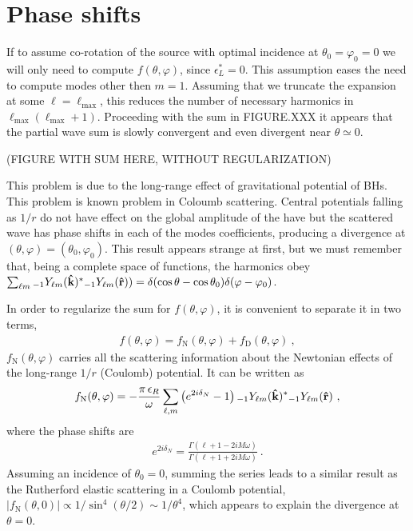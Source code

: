 
\section{Phase shifts}

If to assume co-rotation of the source with optimal incidence at $\theta_0=\varphi_0=0$ we will only need to compute $f(\theta,\varphi)$, since $\epsilon_L^*=0$.
This assumption eases the need to compute modes other then $m=1$.
Assuming that we truncate the expansion  at some $\ell=\ell_{\max}$, this reduces the number of necessary harmonics in $\ell_{\max}(\ell_{\max} + 1)$.
Proceeding with the sum in FIGURE.XXX it appears that the partial wave sum is slowly convergent and even divergent near $\theta \simeq 0$.

(FIGURE WITH SUM HERE, WITHOUT REGULARIZATION)

This problem is due to the long-range effect of gravitational potential of BHs. This problem is known problem in Coloumb scattering. Central potentials falling as $1/r$ do not have effect on the global amplitude of the have but the scattered wave has phase shifts in each of the modes coefficients, producing a divergence at $(\theta,\varphi)=(\theta_0,\varphi_0)$.
This result appears strange at first, but we must remember that, being a complete space of functions, the harmonics obey $\sum_{\ell m} \uu[-1]{Y}{\ell m}(\mathbf{\hat{k}})^{*} \uu[-1]{Y}{\ell m}(\mathbf{\hat{r}})) = \delta(\cos\theta - \cos\theta_0) \delta(\varphi - \varphi_0)$.

In order to regularize the sum for $f(\theta,\varphi)$, it is convenient to separate it in two terms,
\begin{align}
    \label{eq5:fNfD}
    f(\theta,\varphi) = f_\mathrm{N}(\theta,\varphi) + f_\mathrm{D}(\theta,\varphi) ~,
\end{align}
$f_\mathrm{N}(\theta,\varphi)$ carries all the scattering information about the Newtonian effects of the long-range $1/r$ (Coulomb) potential.
It can be written as
\begin{align}
    f_\mathrm{N}(\theta,\varphi) = - \frac{\pi \,\epsilon_R}{\omega}
    \sum_{\ell,m} \left( e^{2 i \delta_N } - 1 \right)
    \uu[-1]{Y}{\ell m}(\mathbf{\hat{k}})^{*} \uu[-1]{Y}{\ell m}(\mathbf{\hat{r}}) ~,
\end{align}
where the phase shifts are \cite{Futterman1988}
\begin{align}
    \label{eq5:phaseShiftN}
    e^{2 i \delta_N } = \frac{\Gamma(\ell + 1 - 2 i M \omega)}{\Gamma(\ell+1 + 2 i M \omega)} ~.
\end{align}
Assuming an incidence of $\theta_0=0$, summing the series leads to a similar result as the Rutherford elastic scattering in a Coulomb potential, $|f_\mathrm{N}(\theta,0)| \propto 1/\sin^{4}(\theta/2) \sim 1/\theta^4$, which appears to explain the divergence at $\theta=0$. 

